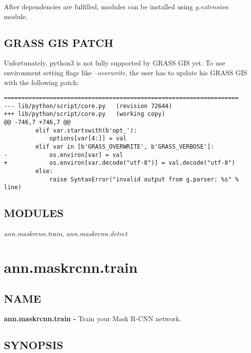 After dependencies are fulfilled, modules can be installed using
\emph{g.extension} module.

\subsection*{GRASS GIS PATCH}

Unfortunately, python3 is not fully supported by GRASS GIS yet. To use
environment setting flags like \emph{--overwrite}, the user has to update
his GRASS GIS with the following patch:

{\footnotesize
\begin{lstlisting}[breaklines=true]
===================================================================
--- lib/python/script/core.py	(revision 72644)
+++ lib/python/script/core.py	(working copy)
@@ -746,7 +746,7 @@
         elif var.startswith(b'opt_'):
             options[var[4:]] = val
         elif var in [b'GRASS_OVERWRITE', b'GRASS_VERBOSE']:
-            os.environ[var] = val
+            os.environ[var.decode("utf-8")] = val.decode("utf-8")
         else:
             raise SyntaxError("invalid output from g.parser: %s" % line)
\end{lstlisting}
}

\subsection*{MODULES}

\emph{ann.maskrcnn.train},\emph{ }\emph{ann.maskrcnn.detect}\emph{ }

\clearpage

\section{ann.maskrcnn.train}

\subsection*{NAME}

\textbf{ann.maskrcnn.train -} Train your Mask R-CNN network.

\subsection*{SYNOPSIS}

